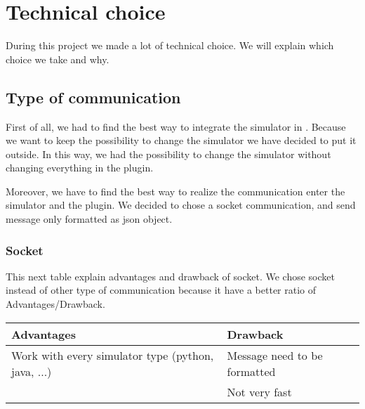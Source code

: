 
\chapter{Technical choice }

During this project we made a lot of technical choice. We will explain which choice we take and why.

\section{Type of communication}

First of all, we had to find the best way to integrate the simulator in \umld. Because we want to keep the possibility to change the simulator we have decided to put it outside. In this way, we had the possibility to change the simulator without changing everything in the plugin.

Moreover, we have to find the best way to realize the communication enter the simulator and the plugin. We decided to chose a socket communication, and send message only formatted as json object.




\subsection{Socket}

This next table explain advantages and drawback of socket. We chose socket instead of other type of communication because it have a better ratio of Advantages/Drawback.
~\\

\begin{tabular}{|p{}||p{}|}
\hline
  \textbf{Advantages}&\textbf{Drawback}\\
\hline
Work with every simulator type (python, java, ...) & Message need to be formatted\\
\hline
& Not very fast\\
\hline
\end{tabular}


